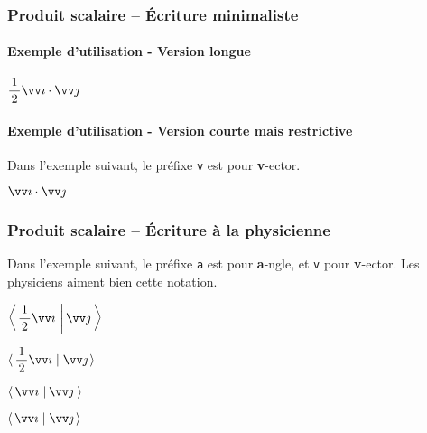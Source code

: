 \documentclass[12pt,a4paper]{article}
\theoremstyle{definition}
\begin{document}


\subsubsection{Produit scalaire -- Écriture minimaliste}

\paragraph{Exemple d'utilisation - Version longue}

\begin{latexex}
$\dotprod{\dfrac{1}{2} \vect{i}}%
         {\vect{j}}$
\end{latexex}




\paragraph{Exemple d'utilisation - Version courte mais restrictive}

Dans l'exemple suivant, le préfixe \verb+v+ est pour \textbf{v}-ector.

\begin{latexex}
$\vdotprod{i}{j}$
\end{latexex}




\subsubsection{Produit scalaire -- Écriture \og à la physicienne \fg}

Dans l'exemple suivant, le préfixe \verb+a+ est pour \textbf{a}-ngle, et  \verb+v+ pour \textbf{v}-ector.
Les physiciens aiment bien cette notation.

\begin{latexex}

$\displaystyle
 \adotprod{\frac{1}{2} \vect{i}}%
          {\vect{j}}$

$\displaystyle
 \adotprod*{\frac{1}{2} \vect{i}}%
           {\vect{j}}$
 
$\vadotprod{i}{j}$

$\vadotprod*{i}{j}$
\end{latexex}
\end{document}
